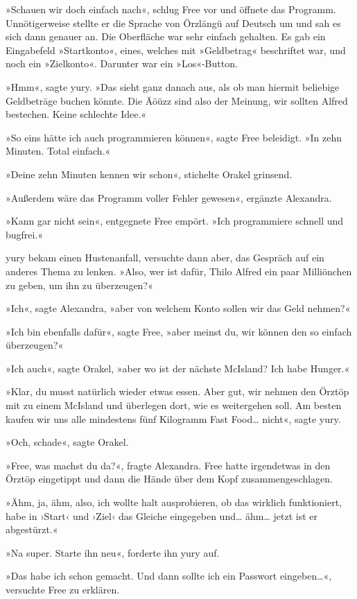 »Schauen wir doch einfach nach«, schlug Free vor und öffnete das Programm. Unnötigerweise stellte er die Sprache von Örzlängü auf Deutsch um und sah es sich dann genauer an. Die Oberfläche war sehr einfach gehalten. Es gab ein Eingabefeld »Startkonto«, eines, welches mit »Geldbetrag« beschriftet war, und noch ein »Zielkonto«. Darunter war ein »Los«-Button.

»Hmm«, sagte yury. »Das sieht ganz danach aus, als ob man hiermit beliebige Geldbeträge buchen könnte. Die Äöüzz sind also der Meinung, wir sollten Alfred bestechen. Keine schlechte Idee.«

»So eins hätte ich auch programmieren können«, sagte Free beleidigt. »In zehn Minuten. Total einfach.«

»Deine zehn Minuten kennen wir schon«, stichelte Orakel grinsend.

»Außerdem wäre das Programm voller Fehler gewesen«, ergänzte Alexandra.

»Kann gar nicht sein«, entgegnete Free empört. »Ich programmiere schnell und bugfrei.«

yury bekam einen Hustenanfall, versuchte dann aber, das Gespräch auf ein anderes Thema zu lenken. »Also, wer ist dafür, Thilo Alfred ein paar Milliönchen zu geben, um ihn zu überzeugen?«

»Ich«, sagte Alexandra, »aber von welchem Konto sollen wir das Geld nehmen?«

»Ich bin ebenfalls dafür«, sagte Free, »aber meinst du, wir können den so einfach überzeugen?«

»Ich auch«, sagte Orakel, »aber wo ist der nächste McIsland? Ich habe Hunger.«

»Klar, du musst natürlich wieder etwas essen. Aber gut, wir nehmen den Örztöp mit zu einem McIsland und überlegen dort, wie es weitergehen soll. Am besten kaufen wir uns alle mindestens fünf Kilogramm Fast Food… nicht«, sagte yury.

»Och, schade«, sagte Orakel.

»Free, was machst du da?«, fragte Alexandra. Free hatte irgendetwas in den Örztöp eingetippt und dann die Hände über dem Kopf zusammengeschlagen.

»Ähm, ja, ähm, also, ich wollte halt ausprobieren, ob das wirklich funktioniert, habe in ›Start‹ und ›Ziel‹ das Gleiche eingegeben und… ähm… jetzt ist er abgestürzt.«

»Na super. Starte ihn neu«, forderte ihn yury auf.

»Das habe ich schon gemacht. Und dann sollte ich ein Passwort eingeben…«, versuchte Free zu erklären.

